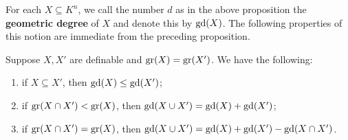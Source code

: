 \noindent
For each $X \subseteq K^n$, we call the number $d$ as in the above proposition the {\bf geometric degree} of $X$ and denote this by $\mathrm{gd}(X)$. The following properties of this notion are immediate from the preceding proposition.

\begin{cor} \label{gdbehavior}
Suppose $X, X'$ are definable and $\mathrm{gr}(X)=\mathrm{gr}(X')$. We have the following:
\begin{enumerate}
\item if $X \subseteq X'$, then $\mathrm{gd}(X) \leq \mathrm{gd}(X')$;
\item if $\mathrm{gr}(X \cap X')< \mathrm{gr}(X)$, then $\mathrm{gd}(X \cup X') =\mathrm{gd}(X) +\mathrm{gd}(X')$;
\item if $\mathrm{gr}(X \cap X')= \mathrm{gr}(X)$, then $ \mathrm{gd}(X \cup X') =\mathrm{gd}(X) +\mathrm{gd}(X') - \mathrm{gd}(X \cap X')$.
\end{enumerate}
\end{cor}

